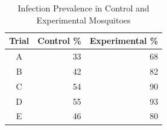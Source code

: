 \begin{table}[t!]
\centering
\begin{tabular}{crr}
\toprule
Trial & Control \% &  Experimental \% \\
\midrule
A & 33 & 68 \\
B & 42 & 82 \\
C & 54 & 90 \\
D & 55 & 93 \\
E & 46 & 80 \\
\bottomrule
\end{tabular}
\caption{\centering Infection Prevalence in Control and Experimental Mosquitoes}
\label{infection}
\end{table}
